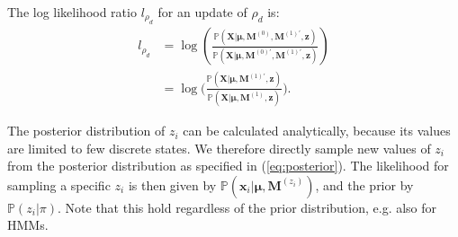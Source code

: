 \documentclass[a4paper,11pt]{article}
\def\M{\boldsymbol{M}}
\def\X{\boldsymbol{X}}
\def\x{\boldsymbol{x}}
\def\bmu{\boldsymbol{\mu}}
\def\p{\mathbb{P}}
\begin{document}
The log likelihood ratio $l_{\rho_d}$ for an update of $\rho_d$ is:
\begin{align*}
l_{\rho_d} &= \log \left( \frac{\p(\X | \bmu, \M^{(0)}, \M^{(1)'}, \boldsymbol z )}{\p(\X | \bmu, \M^{(0)'}, \M^{(1)'}, \boldsymbol z )} \right) \\
 &= \log \Bigg( \frac{\p(\X | \bmu, \M^{(1)'}, \boldsymbol z)}{\p(\X | \bmu, \M^{(1)}, \boldsymbol z)} \Bigg).
\end{align*}


The posterior distribution of $z_i$ can be calculated analytically, because its values are limited to few discrete states. We therefore directly sample new values of $z_i$ from the posterior distribution as specified in (\ref{eq:posterior}). The likelihood for sampling a specific $z_i$ is then given by $\p(\x_i | \bmu, \M^{(z_i)})$, and the prior by $\p(z_i | \pi )$. Note that this hold regardless of the prior distribution, e.g. also for HMMs.
\end{document}
